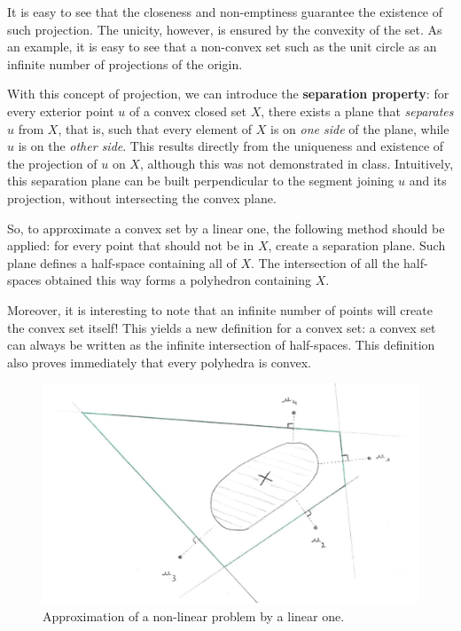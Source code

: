 It is easy to see that the closeness and non-emptiness guarantee the existence of such projection. The unicity, however, is ensured by the convexity of the set. As an example, it is easy to see that a non-convex set such as the unit circle as an infinite number of projections of the origin.


With this concept of projection, we can introduce the \textbf{separation property}: for every exterior point $u$ of a convex closed set $X$, there exists a plane that \textit{separates} $u$ from $X$, that is, such that every element of $X$ is on \textit{one side} of the plane, while $u$ is on the \textit{other side}. This results directly from the uniqueness and existence of the projection of $u$ on $X$, although this was not demonstrated in class. Intuitively, this separation plane can be built perpendicular to the segment joining $u$ and its projection, without intersecting the convex plane.

So, to approximate a convex set by a linear one, the following method should be applied: for every point that should not be in $X$, create a separation plane. Such plane defines a half-space containing all of $X$. The intersection of all the half-spaces obtained this way forms a polyhedron containing $X$.

Moreover, it is interesting to note that an infinite number of points will create the convex set itself! This yields a new definition for a convex set: a convex set can always be written as the infinite intersection of half-spaces. This definition also proves immediately that every polyhedra is convex.

\begin{figure}[H]
\centering
\includegraphics[scale=.4]{./images/Course2_Scan}
\caption{Approximation of a non-linear problem by a linear one.}
\label{labello}
\end{figure}
%
